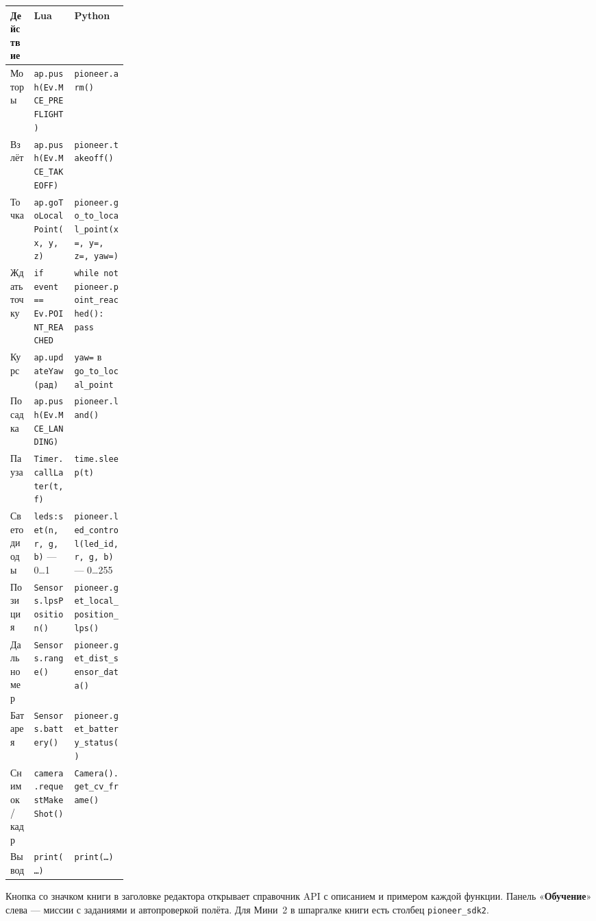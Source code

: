 \documentclass[11pt,a4paper]{article}
\newcommand{\ui}[1]{«\textbf{#1}»}
\begin{document}
\begin{center}
\small
\renewcommand{\arraystretch}{1.15}
\begin{tabularx}{\linewidth}{@{}>{\raggedright\arraybackslash}p{0.2\linewidth} >{\raggedright\arraybackslash}X >{\raggedright\arraybackslash}X@{}}
\toprule
\textbf{Действие} & \textbf{Lua} & \textbf{Python} \\
\midrule
Моторы          & \texttt{ap.push(Ev.MCE\_PREFLIGHT)} & \texttt{pioneer.arm()} \\
Взлёт           & \texttt{ap.push(Ev.MCE\_TAKEOFF)} & \texttt{pioneer.takeoff()} \\
Точка           & \texttt{ap.goToLocalPoint(x, y, z)} & \texttt{pioneer.go\_to\_local\_point(x=, y=, z=, yaw=)} \\
Ждать точку     & \texttt{if event == Ev.POINT\_REACHED} & \texttt{while not pioneer.point\_reached(): pass} \\
Курс            & \texttt{ap.updateYaw(рад)} & \texttt{yaw=} в \texttt{go\_to\_local\_point} \\
Посадка         & \texttt{ap.push(Ev.MCE\_LANDING)} & \texttt{pioneer.land()} \\
Пауза           & \texttt{Timer.callLater(t, f)} & \texttt{time.sleep(t)} \\
Светодиоды      & \texttt{leds:set(n, r, g, b)} — 0…1 & \texttt{pioneer.led\_control(led\_id, r, g, b)} — 0…255 \\
Позиция         & \texttt{Sensors.lpsPosition()} & \texttt{pioneer.get\_local\_position\_lps()} \\
Дальномер       & \texttt{Sensors.range()} & \texttt{pioneer.get\_dist\_sensor\_data()} \\
Батарея         & \texttt{Sensors.battery()} & \texttt{pioneer.get\_battery\_status()} \\
Снимок / кадр   & \texttt{camera.requestMakeShot()} & \texttt{Camera().get\_cv\_frame()} \\
Вывод           & \texttt{print(\dots)} & \texttt{print(\dots)} \\
\bottomrule
\end{tabularx}
\end{center}

\begin{tip}
Кнопка со значком книги в заголовке редактора открывает справочник API с описанием и примером каждой
функции. Панель \ui{Обучение} слева — миссии с заданиями и автопроверкой полёта. Для Мини~2 в шпаргалке книги есть столбец \texttt{pioneer\_sdk2}.
\end{tip}
\end{document}
